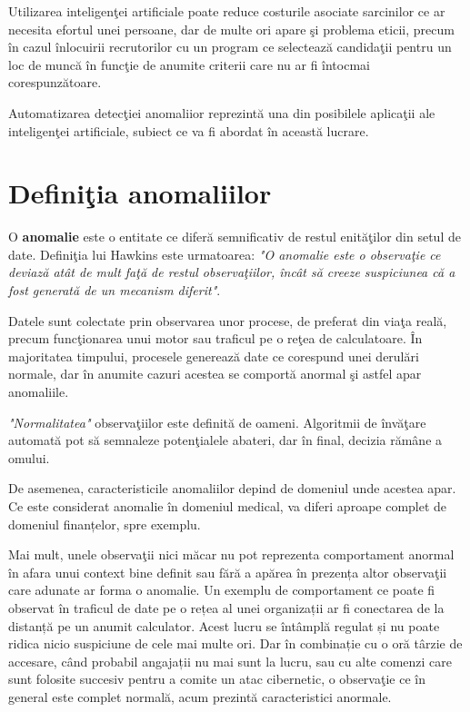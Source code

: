 Utilizarea inteligenţei artificiale poate reduce costurile asociate 
sarcinilor ce ar necesita efortul unei persoane, dar de multe ori apare şi 
problema eticii, precum în cazul înlocuirii recrutorilor cu un program 
ce selectează candidaţii pentru un loc de muncă în funcţie de anumite 
criterii care nu ar fi întocmai corespunzătoare.

Automatizarea detecţiei anomaliior reprezintă una din posibilele aplicaţii
ale inteligenţei artificiale, subiect ce va fi abordat în această lucrare.

\section{Definiţia anomaliilor}


O \textbf{anomalie} este o entitate ce diferă semnificativ de restul enităţilor din 
setul de date. Definiţia lui Hawkins este urmatoarea\cite{hawkins1980identification}:
\textit{"O anomalie este o observaţie ce deviază atât de mult faţă de restul observaţiilor,
încât să creeze suspiciunea că a fost generată de un mecanism diferit"}.

Datele sunt colectate prin observarea unor procese, de preferat din viaţa reală, 
precum funcţionarea
unui motor sau traficul pe o reţea de calculatoare. În majoritatea timpului, procesele
generează date ce corespund unei derulări normale, dar în anumite cazuri acestea se 
comportă anormal şi astfel apar anomaliile. 

\textit{"Normalitatea"} observaţiilor este definită
de oameni. Algoritmii de învăţare automată pot să semnaleze potenţialele
abateri, dar în final, decizia rămâne a omului.

De asemenea, caracteristicile anomaliilor depind de domeniul 
unde acestea apar. Ce este considerat anomalie în domeniul 
medical, va diferi aproape complet de domeniul finanțelor, 
spre exemplu. 

Mai mult, unele observaţii nici măcar nu 
pot reprezenta comportament anormal în afara unui context 
bine definit sau fără a apărea în prezența altor observaţii
care adunate ar forma o anomalie. Un exemplu de comportament
ce poate fi observat în traficul de date pe o rețea al unei 
organizații ar fi 
conectarea de la distanță pe un anumit calculator. Acest lucru
se întâmplă regulat și nu poate ridica nicio suspiciune de 
cele mai multe ori. Dar în combinație cu o oră târzie de 
accesare, când probabil angajații nu mai sunt la lucru, 
sau cu alte comenzi care sunt folosite succesiv pentru a 
comite un atac cibernetic, o observaţie ce în general 
este complet normală, acum prezintă caracteristici anormale.

